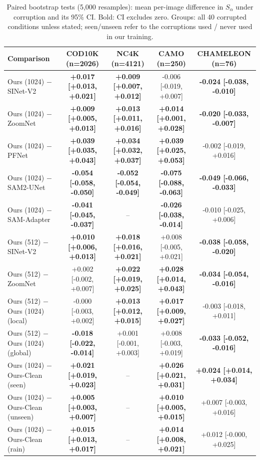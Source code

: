 \begin{table}[t]
\centering
\caption{Paired bootstrap tests (5{,}000 resamples): mean per-image difference in $S_\alpha$ under corruption and its 95\% CI. Bold: CI excludes zero. Groups: all 40 corrupted conditions unless stated; seen/unseen refer to the corruptions used / never used in our training.}
\label{tab:significance}
\footnotesize
\begin{tabular}{lcccc}
\toprule
Comparison & COD10K (n=2026) & NC4K (n=4121) & CAMO (n=250) & CHAMELEON (n=76) \\
\midrule
Ours (1024) $-$ SINet-V2 & \textbf{+0.017 [+0.013, +0.021]} & \textbf{+0.009 [+0.007, +0.012]} & -0.006 [-0.019, +0.007] & \textbf{-0.024 [-0.038, -0.010]} \\
Ours (1024) $-$ ZoomNet & \textbf{+0.009 [+0.005, +0.013]} & \textbf{+0.013 [+0.011, +0.016]} & \textbf{+0.014 [+0.001, +0.028]} & \textbf{-0.020 [-0.033, -0.007]} \\
Ours (1024) $-$ PFNet & \textbf{+0.039 [+0.035, +0.043]} & \textbf{+0.034 [+0.032, +0.037]} & \textbf{+0.039 [+0.025, +0.053]} & -0.002 [-0.019, +0.016] \\
Ours (1024) $-$ SAM2-UNet & \textbf{-0.054 [-0.058, -0.050]} & \textbf{-0.052 [-0.054, -0.049]} & \textbf{-0.075 [-0.088, -0.063]} & \textbf{-0.049 [-0.066, -0.033]} \\
Ours (1024) $-$ SAM-Adapter & \textbf{-0.041 [-0.045, -0.037]} & -- & \textbf{-0.026 [-0.038, -0.014]} & -0.010 [-0.025, +0.006] \\
Ours (512) $-$ SINet-V2 & \textbf{+0.010 [+0.006, +0.013]} & \textbf{+0.018 [+0.016, +0.021]} & +0.008 [-0.005, +0.021] & \textbf{-0.038 [-0.058, -0.020]} \\
Ours (512) $-$ ZoomNet & +0.002 [-0.002, +0.007] & \textbf{+0.022 [+0.019, +0.025]} & \textbf{+0.028 [+0.014, +0.043]} & \textbf{-0.034 [-0.054, -0.016]} \\
Ours (512) $-$ Ours (1024) (local) & -0.000 [-0.003, +0.002] & \textbf{+0.013 [+0.012, +0.015]} & \textbf{+0.017 [+0.009, +0.027]} & -0.003 [-0.018, +0.011] \\
Ours (512) $-$ Ours (1024) (global) & \textbf{-0.018 [-0.022, -0.014]} & +0.001 [-0.001, +0.003] & +0.008 [-0.003, +0.019] & \textbf{-0.033 [-0.052, -0.016]} \\
Ours (1024) $-$ Ours-Clean (seen) & \textbf{+0.021 [+0.019, +0.023]} & -- & \textbf{+0.026 [+0.021, +0.031]} & \textbf{+0.024 [+0.014, +0.034]} \\
Ours (1024) $-$ Ours-Clean (unseen) & \textbf{+0.005 [+0.003, +0.007]} & -- & \textbf{+0.010 [+0.005, +0.015]} & +0.007 [-0.003, +0.016] \\
Ours (1024) $-$ Ours-Clean (rain) & \textbf{+0.015 [+0.013, +0.017]} & -- & \textbf{+0.014 [+0.008, +0.021]} & +0.012 [-0.000, +0.025] \\
\bottomrule
\end{tabular}
\end{table}
